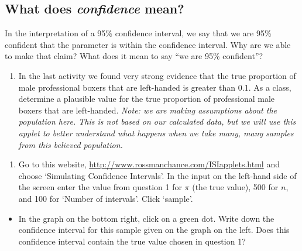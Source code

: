 \documentclass[
]{report}
\providecommand{\tightlist}{%
  \setlength{\itemsep}{0pt}\setlength{\parskip}{0pt}}
\begin{document}
\subsection*{\texorpdfstring{What does \emph{confidence} mean?}{What does confidence mean?}}\label{what-does-confidence-mean}

In the interpretation of a 95\% confidence interval, we say that we are 95\% confident that the parameter is within the confidence interval. Why are we able to make that claim? What does it mean to say ``we are 95\% confident''?

\begin{enumerate}
\def\labelenumi{\arabic{enumi}.}
\tightlist
\item
  In the last activity we found very strong evidence that the true proportion of male professional boxers that are left-handed is greater than 0.1. As a class, determine a plausible value for the true proportion of professional male boxers that are left-handed. \emph{Note: we are making assumptions about the population here. This is not based on our calculated data, but we will use this applet to better understand what happens when we take many, many samples from this believed population.}
\end{enumerate}

\vspace{0.2in}

\begin{enumerate}
\def\labelenumi{\arabic{enumi}.}
\setcounter{enumi}{1}
\tightlist
\item
  Go to this website, \url{http://www.rossmanchance.com/ISIapplets.html} and choose `Simulating Confidence Intervals'. In the input on the left-hand side of the screen enter the value from question 1 for \(\pi\) (the true value), 500 for \(n\), and 100 for `Number of intervals'. Click `sample'.
\end{enumerate}

\vspace{1mm}

\begin{itemize}
\tightlist
\item
  In the graph on the bottom right, click on a green dot. Write down the confidence interval for this sample given on the graph on the left. Does this confidence interval contain the true value chosen in question 1?
\end{itemize}

\vspace{0.4in}
\end{document}
